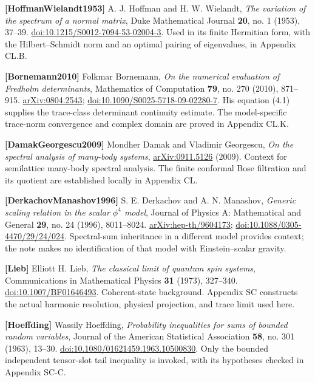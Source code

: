 \documentclass[a4paper,11pt]{article}
\numberwithin{equation}{section}
\begin{document}
\textbf{{[}HoffmanWielandt1953{]}} A. J. Hoffman and H. W. Wielandt, \emph{The variation of the spectrum of a normal matrix}, Duke Mathematical Journal \textbf{20}, no. 1 (1953), 37--39. \href{https://doi.org/10.1215/S0012-7094-53-02004-3}{doi:10.1215/S0012-7094-53-02004-3}. Used in its finite Hermitian form, with the Hilbert--Schmidt norm and an optimal pairing of eigenvalues, in Appendix CL.B.

\textbf{{[}Bornemann2010{]}} Folkmar Bornemann, \emph{On the numerical evaluation of Fredholm determinants}, Mathematics of Computation \textbf{79}, no. 270 (2010), 871--915. \href{https://arxiv.org/abs/0804.2543}{arXiv:0804.2543}; \href{https://doi.org/10.1090/S0025-5718-09-02280-7}{doi:10.1090/S0025-5718-09-02280-7}. His equation (4.1) supplies the trace-class determinant continuity estimate. The model-specific trace-norm convergence and complex domain are proved in Appendix CL.K.

\textbf{{[}DamakGeorgescu2009{]}} Mondher Damak and Vladimir Georgescu, \emph{On the spectral analysis of many-body systems}, \href{https://arxiv.org/abs/0911.5126}{arXiv:0911.5126} (2009). Context for semilattice many-body spectral analysis. The finite conformal Bose filtration and its quotient are established locally in Appendix CL.

\textbf{{[}DerkachovManashov1996{]}} S. E. Derkachov and A. N. Manashov, \emph{Generic scaling relation in the scalar \(\phi^4\) model}, Journal of Physics A: Mathematical and General \textbf{29}, no. 24 (1996), 8011--8024. \href{https://arxiv.org/abs/hep-th/9604173}{arXiv:hep-th/9604173}; \href{https://doi.org/10.1088/0305-4470/29/24/024}{doi:10.1088/0305-4470/29/24/024}. Spectral-sum inheritance in a different model provides context; the note makes no identification of that model with Einstein--scalar gravity.

\textbf{{[}Lieb{]}} Elliott H. Lieb, \emph{The classical limit of quantum spin systems}, Communications in Mathematical Physics \textbf{31} (1973), 327--340. \href{https://doi.org/10.1007/BF01646493}{doi:10.1007/BF01646493}. Coherent-state background. Appendix SC constructs the actual harmonic resolution, physical projection, and trace limit used here.

\textbf{{[}Hoeffding{]}} Wassily Hoeffding, \emph{Probability inequalities for sums of bounded random variables}, Journal of the American Statistical Association \textbf{58}, no. 301 (1963), 13--30. \href{https://doi.org/10.1080/01621459.1963.10500830}{doi:10.1080/01621459.1963.10500830}. Only the bounded independent tensor-slot tail inequality is invoked, with its hypotheses checked in Appendix SC-C.
\end{document}
